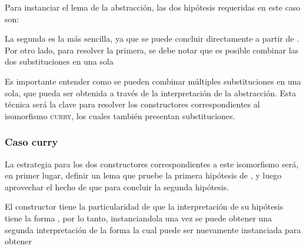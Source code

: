 Para instanciar el lema de la abstracción, las dos hipótesis requeridas en este caso son:

\vspace{1em}
\snstar
{}

\snstar
\subst
{\cons
	{\const{[}  \const{]≡} }
	{}}
{}
\vspace{1em}

La segunda es la más sencilla, ya que se puede concluir directamente a partir de .
Por otro lado, para resolver la primera, se debe notar que es posible combinar las dos substituciones en una sola 
\subst
{\cons
	{\const{[}  \const{]≡} }
	{\parens{\comp{\ids}{\bound{$\rho$}}}}}
{}


Es importante entender como se pueden combinar múltiples substituciones en una sola, que pueda ser obtenida a través de la interpretación de la abstracción.
Esta técnica será la clave para resolver los constructores correspondientes al isomorfismo \textsc{curry}, los cuales también presentan substituciones.

\subsubsection{Caso curry}

La estrategia para los dos constructores correspondientes a este isomorfismo será, en primer lugar, definir un lema que pruebe la primera hipótesis de , y luego aprovechar el hecho de que
  
para concluir la segunda hipótesis.

El constructor  tiene la particularidad de que la interpretación de su hipótesis tiene la forma 
, por lo tanto, instanciandola una vez se puede obtener una segunda interpretación de la forma
la cual puede ser nuevamente instanciada para obtener

